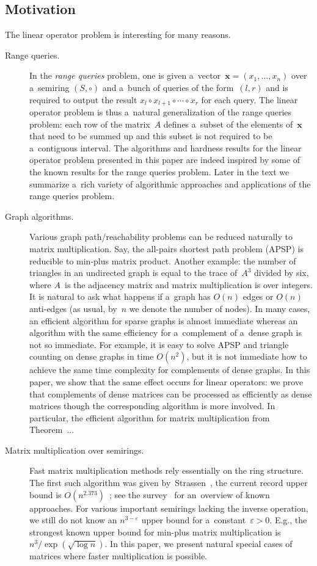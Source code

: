 \documentclass[11pt,letterpaper]{article}
\begin{document}
\subsection{Motivation}
The linear operator problem is interesting for many reasons.
\begin{description}
\item[Range queries.] In the \emph{range queries} problem, 
one is given a~vector~$\mathbf{x}=(x_1, \dotsc, x_n)$ over 
a~semiring $(S, \circ)$ and 
a~bunch of queries of the form~$(l,r)$ and is required to 
output the result $x_l \circ x_{l+1} \circ \dotsb \circ x_r$ 
for each query. The linear operator problem is thus a~natural
generalization of the range queries problem: each row of the
matrix~$A$ defines a~subset of the elements of~$\mathbf{x}$
that need to be summed up and this subset is not required to be 
a~contiguous interval. The algorithms and hardness results for 
the linear operator problem presented in this paper 
are indeed inspired 
by some of the known results for the range queries problem.
Later in the text we summarize a~rich
variety of algorithmic approaches and applications of the range 
queries problem.

\item[Graph algorithms.] Various graph path/reachability 
problems can be reduced naturally to matrix multiplication. 
Say, the all-pairs shortest path problem (APSP) is reducible
to min-plus matrix product. Another example: 
the number of triangles in an undirected graph is equal to
the trace of~$A^3$ divided by six, 
where $A$~is the adjacency matrix and matrix 
multiplication is over integers. It is natural to ask what happens if
a~graph has $O(n)$ edges or $O(n)$ anti-edges 
(as usual, by~$n$ we denote the number of nodes). 
In many cases, an efficient algorithm for sparse graphs is 
almost immediate whereas an algorithm with the same efficiency
for a~complement of a~dense graph is not so immediate. For
example, it is easy to solve APSP and triangle counting on dense graphs in time $O(n^2)$, but it is not immediate how to achieve
the same time complexity for complements of dense graphs.
In this paper, we show that the same effect occurs for linear operators: we prove that complements of dense matrices can be 
processed as efficiently as dense matrices though the corresponding algorithm is more involved. In particular, the efficient 
algorithm for matrix multiplication from Theorem~...

\item[Matrix multiplication over semirings.] Fast matrix
 multiplication methods rely essentially on the ring structure.
The first such algorithm was given by~Strassen~\cite{}, 
the current record upper bound is $O(n^{2.373})$~\cite{}; 
see the survey~\cite{} for an~overview of known approaches.
For various important semirings lacking the inverse operation, 
we still do not know an $n^{3-\varepsilon}$ upper bound for
 a~constant~$\varepsilon>0$. 
E.g., the strongest known upper bound for min-plus matrix
multiplication is $n^3/\exp(\sqrt{\log n})$. In this paper, we present natural special cases of matrices where 
faster multiplication is possible.


\end{description}
\end{document}
